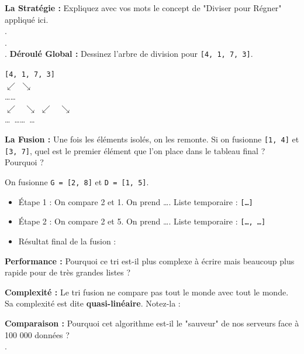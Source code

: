 \documentclass[12pt,a4paper]{report}
\begin{document}
\begin{Exercise}[title={Analyse du Tri Fusion }]
    \Question \textbf{La Stratégie :} Expliquez avec vos mots le concept de "Diviser pour Régner" appliqué ici.\\
    .\dotfill \\
    .\dotfill \\
    .\dotfill
    \Question \textbf{Déroulé Global :} Dessinez l'arbre de division pour \texttt{[4, 1, 7, 3]}.
    \begin{center}
        \texttt{[4, 1, 7, 3]} \\
        $\swarrow$ \quad $\searrow$ \\
        \dots \quad \dots \\
        $\swarrow$ \ $\searrow$ \quad $\swarrow$ \ $\searrow$ \\
        \dots \ \dots \quad \dots \ \dots
    \end{center}

    \Question \textbf{La Fusion :} Une fois les éléments isolés, on les remonte. Si on fusionne \texttt{[1, 4]} et \texttt{[3, 7]}, quel est le premier élément que l'on place dans le tableau final ? Pourquoi ? \dotfill

    
    \Question On fusionne \texttt{G = [2, 8]} et \texttt{D = [1, 5]}.
    \begin{itemize}
        \item Étape 1 : On compare 2 et 1. On prend \dots. Liste temporaire : \texttt{[\dots]}
        \item Étape 2 : On compare 2 et 5. On prend \dots. Liste temporaire : \texttt{[\dots, \dots]}
        \item Résultat final de la fusion : \dotfill
    \end{itemize}
    
    \Question \textbf{Performance :} Pourquoi ce tri est-il plus complexe à écrire mais beaucoup plus rapide pour de très grandes listes ? \dotfill
    
    \Question \textbf{Complexité :} Le tri fusion ne compare pas tout le monde avec tout le monde. Sa complexité est dite \textbf{quasi-linéaire}. Notez-la : \dotfill

    \Question \textbf{Comparaison :} Pourquoi cet algorithme est-il le "sauveur" de nos serveurs face à 100 000 données ?\\ 
    .\dotfill
\end{Exercise}
\end{document}
